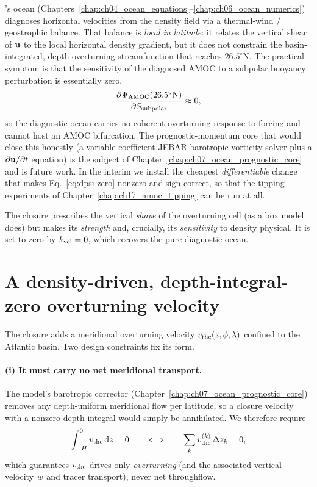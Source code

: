 \model{}'s ocean (Chapters~\ref{chap:ch04_ocean_equations}--\ref{chap:ch06_ocean_numerics})
diagnoses horizontal velocities from the density field via a thermal-wind /
geostrophic balance. That balance is \emph{local in latitude}: it relates the
vertical shear of $\mathbf{u}$ to the local horizontal density gradient, but it does
not constrain the basin-integrated, depth-overturning streamfunction that reaches
$26.5^{\circ}\mathrm{N}$. The practical symptom is that the sensitivity of the
diagnosed AMOC to a subpolar buoyancy perturbation is essentially zero,
\begin{equation}
  \frac{\partial \Psi_{\mathrm{AMOC}}(26.5^{\circ}\mathrm{N})}{\partial S_{\mathrm{subpolar}}} \approx 0,
  \label{eq:dpsi-zero}
\end{equation}
so the diagnostic ocean carries no coherent overturning response to forcing and
cannot host an AMOC bifurcation. The prognostic-momentum core that would close
this honestly (a variable-coefficient JEBAR barotropic-vorticity solver plus a
$\partial\mathbf{u}/\partial t$ equation) is the subject of Chapter~\ref{chap:ch07_ocean_prognostic_core}
and is future work. In the interim we install the cheapest \emph{differentiable}
change that makes Eq.~\eqref{eq:dpsi-zero} nonzero and sign-correct, so that the
tipping experiments of Chapter~\ref{chap:ch17_amoc_tipping} can be run at all.

\begin{remark}
The closure prescribes the vertical \emph{shape} of the overturning cell (as a
box model does) but makes its \emph{strength} and, crucially, its \emph{sensitivity}
to density physical. It is set to zero by $k_{\mathrm{vel}}=0$, which recovers the pure
diagnostic ocean.
\end{remark}

\section{A density-driven, depth-integral-zero overturning velocity}

The closure adds a meridional overturning velocity $v_{\mathrm{thc}}(z,\phi,\lambda)$ confined
to the Atlantic basin. Two design constraints fix its form.

\paragraph{(i) It must carry no net meridional transport.}
The model's barotropic corrector (Chapter~\ref{chap:ch07_ocean_prognostic_core})
removes any depth-uniform meridional flow per latitude, so a closure velocity
with a nonzero depth integral would simply be annihilated. We therefore require
\begin{equation}
  \int_{-H}^{0} v_{\mathrm{thc}} \,\mathrm{d} z = 0
  \qquad\Longleftrightarrow\qquad
  \sum_{k} v_{\mathrm{thc}}^{(k)}\,\Delta z_k = 0 ,
  \label{eq:depthzero}
\end{equation}
which guarantees $v_{\mathrm{thc}}$ drives only \emph{overturning} (and the associated
vertical velocity $w$ and tracer transport), never net throughflow.

